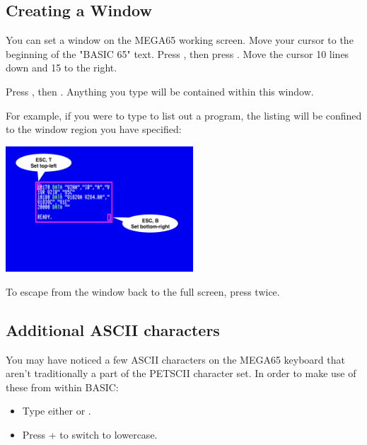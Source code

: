 \subsection{Creating a Window}

You can set a window on the MEGA65 working screen. Move your cursor to the beginning of the "BASIC 65" text. Press , then press . Move the cursor 10 lines down and 15 to the right.

Press , then . Anything you type will be contained within this window.

For example, if you were to type  to list out a program, the listing will be confined to the window region you have specified:

\begin{center}
\includegraphics[width={7cm}]{images/set-window.png}
\end{center}

To escape from the window back to the full screen, press  twice.

\subsection{Additional ASCII characters}

You may have noticed a few ASCII characters on the MEGA65 keyboard that aren't traditionally a part of the PETSCII character set. In order to make use of these from within BASIC:

\begin{itemize}
  \item Type either  or .
  \item Press \megasymbolkey +  to switch to lowercase.
\end{itemize}

